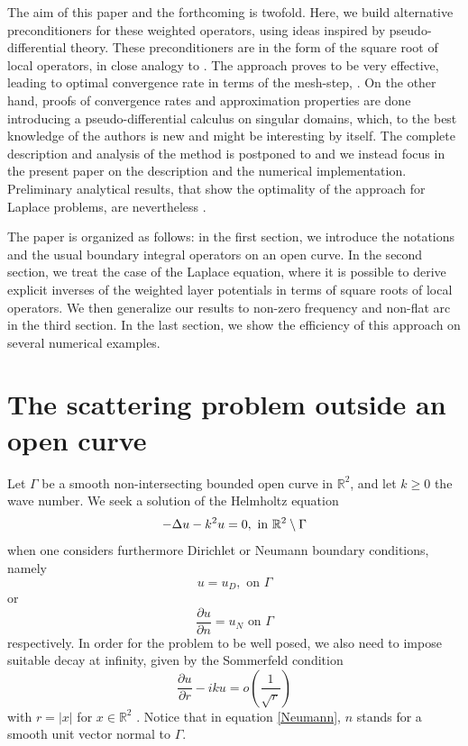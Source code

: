 \documentclass[a4paper]{article}
\begin{document}
The aim of this paper and the forthcoming \cite{averseng} is twofold. Here, we build alternative preconditioners for these weighted operators, 
using ideas inspired by pseudo-differential theory. These preconditioners are in the form of the square root of local operators, in close analogy to 
\cite{antoine2007generalized}. The approach proves to be very effective, leading to optimal convergence rate in terms of the mesh-step, . On the other hand, proofs of convergence rates and approximation 
properties are done introducing a pseudo-differential calculus on singular domains, which, to the best knowledge of the authors is new and 
might be interesting by itself. The complete description and analysis of the method is postponed to \cite{averseng} and we instead focus in 
the present paper on the description and the numerical implementation. Preliminary analytical results, that show the optimality of the approach
for Laplace problems, are nevertheless .
	
The paper is organized as follows: in the first section, we introduce the notations and the usual boundary integral operators on an open curve. 
In the second section, we treat the case of the Laplace equation, where it is possible to derive explicit inverses of the weighted layer potentials 
in terms of square roots of local operators. We then generalize our results to non-zero frequency and non-flat arc in the third section. In the last 
section, we show the efficiency of this approach on several numerical examples. 


\section{The scattering problem outside an open curve}

Let $\Gamma$ be a smooth non-intersecting bounded open curve in $\mathbb{R}^2$, and let $k \geq 0$ the wave number. We seek a solution 
of the Helmholtz equation
\begin{equation}
	-\Delta u - k^2 u = 0,  \text{ in } \mathbb{R}^2 \setminus \Gamma
	\label{Helmholtz}
\end{equation}
when one considers furthermore Dirichlet or Neumann boundary conditions, namely
\begin{equation}
	u = u_D, \text{ on } \Gamma
\label{Dirichlet}
\end{equation}
or
\begin{equation} 
	\dfrac{\partial u}{\partial n} = u_N  \text{ on } \Gamma 
\label{Neumann}
\end{equation}
respectively. In order for the problem to be well posed, we also need to impose suitable decay at infinity, given by the Sommerfeld condition
\begin{equation}
	\dfrac{\partial u}{\partial r} - iku = o\left(\frac{1}{\sqrt{r}}\right)
\label{Sommerfeld}
\end{equation}
with $r=|x|$ for $x\in \mathbb{R}^2$ .
Notice that in equation \eqref{Neumann}, $n$ stands for a smooth unit vector normal to $\Gamma$. 
\end{document}
